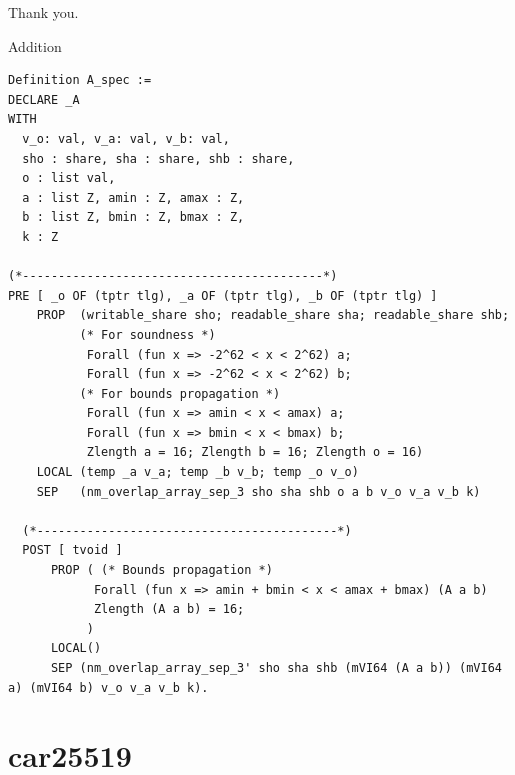 \documentclass[8pt]{beamer}
\begin{document}
%
%
\begin{frame}[standout]
	\Huge Thank you.
\end{frame}


\appendix


\begin{frame}[fragile]{Addition}
\begin{center}
\begin{lstlisting}[language=CoqVST]
Definition A_spec :=
DECLARE _A
WITH
  v_o: val, v_a: val, v_b: val,
  sho : share, sha : share, shb : share,
  o : list val,
  a : list Z, amin : Z, amax : Z,
  b : list Z, bmin : Z, bmax : Z,
  k : Z

(*------------------------------------------*)
PRE [ _o OF (tptr tlg), _a OF (tptr tlg), _b OF (tptr tlg) ]
    PROP  (writable_share sho; readable_share sha; readable_share shb;
          (* For soundness *)
           Forall (fun x => -2^62 < x < 2^62) a;
           Forall (fun x => -2^62 < x < 2^62) b;
          (* For bounds propagation *)
           Forall (fun x => amin < x < amax) a;
           Forall (fun x => bmin < x < bmax) b;
           Zlength a = 16; Zlength b = 16; Zlength o = 16)
    LOCAL (temp _a v_a; temp _b v_b; temp _o v_o)
    SEP   (nm_overlap_array_sep_3 sho sha shb o a b v_o v_a v_b k)

  (*------------------------------------------*)
  POST [ tvoid ]
      PROP ( (* Bounds propagation *)
            Forall (fun x => amin + bmin < x < amax + bmax) (A a b)
            Zlength (A a b) = 16;
           )
      LOCAL()
      SEP (nm_overlap_array_sep_3' sho sha shb (mVI64 (A a b)) (mVI64 a) (mVI64 b) v_o v_a v_b k).
\end{lstlisting}
\end{center}
\end{frame}


\section{car25519}

%
%
\end{document}
